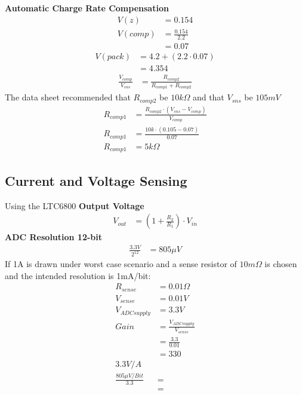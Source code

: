\documentclass{article}
\numberwithin{figure}{section}
\numberwithin{equation}{section}
\begin{document}
{\textbf{Automatic Charge Rate Compensation}
\begin{align}
  \label{eq:comp}
  V(z) &= 0.154 \\
  V(comp) &= \frac{0.154}{2.2} \\
  &= 0.07
\end{align}
\begin{align}
  \label{eq:comp2}
  V(pack) &= 4.2 + (2.2 \cdot 0.07)\\
  &= 4.354
\end{align}
\begin{align}
  \label{eq:comp3}
  \frac{V_{comp}}{V_{sns}} &= \frac{R_{comp2}}{R_{comp1}+R_{comp2}}
\end{align}
The data sheet recommended that $R_{comp2}$ be $10k\Omega$ and that $V_{sns}$ be $105mV$
\begin{align}
  \label{eq:rcomps}
  R_{comp1}&=\frac{R_{comp2} \cdot \left(V_{sns}-V_{comp}\right)}{V_{comp}} \\
  R_{comp1}&=\frac{10k \cdot (0.105 - 0.07)}{0.07} \\
  R_{comp1}&=5k\Omega
\end{align}

\subsection{Current and Voltage Sensing}
Using the LTC6800
\textbf{Output Voltage}
\begin{align}
  \label{eq:vout}
  V_{out} &= \left(1+\frac{R_2}{R_1}\right)\cdot V_{in}
\end{align}
\textbf{ADC Resolution 12-bit}
\begin{align}
  \label{eq:adcres}
  \frac{3.3V}{2^{12}} &= 805\mu V
\end{align}
If 1A is drawn under worst case scenario and a sense resistor of $10m\Omega$ is chosen and the intended resolution is 1mA/bit: \newline
\begin{align}
  \label{eq:asense}
  R_{sense} &= 0.01 \Omega \\
  V_{sense} &= 0.01 V \\
  V_{ADCsupply} &= 3.3V \\
  Gain &= \frac{V_{ADCsupply}}{V_{sense}} \\
  &= \frac{3.3}{0.01} \\
  &= 330 \\
  3.3V/A \\
  \frac{805\mu V/Bit}{3.3} &= \\
  &=
\end{align}

}
\end{document}
